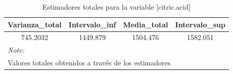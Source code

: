 \documentclass[
]{article}
\begin{document}
\begin{table}[!h]

\caption{\label{tab:estimadores finales totales}Estimadores totales para la variable [citric.acid]}
\centering
\fontsize{8}{10}\selectfont
\begin{tabular}[t]{c|c|c|c}
\hline
Varianza\_total & Intervalo\_inf & Media\_total & Intervalo\_sup\\
\hline
\rowcolor{gray!6}  745.2032 & 1449.879 & 1504.476 & 1582.051\\
\hline
\multicolumn{4}{l}{\textit{Note: }}\\
\multicolumn{4}{l}{Valores totales obtenidos a través de los estimadores}\\
\end{tabular}
\end{table}
\end{document}
